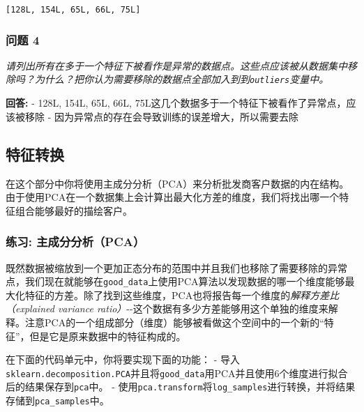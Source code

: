 \documentclass[11pt]{article}
\begin{document}
    
    \begin{Verbatim}[commandchars=\\\{\}]
[128L, 154L, 65L, 66L, 75L]

    \end{Verbatim}

    \subsubsection{问题 4}\label{ux95eeux9898-4}

\emph{请列出所有在多于一个特征下被看作是异常的数据点。这些点应该被从数据集中移除吗？为什么？把你认为需要移除的数据点全部加入到到\texttt{outliers}变量中。}

    \textbf{回答:} - 128L, 154L, 65L, 66L,
75L这几个数据多于一个特征下被看作了异常点，应该被移除 -
因为异常点的存在会导致训练的误差增大，所以需要去除

    \subsection{特征转换}\label{ux7279ux5f81ux8f6cux6362}

在这个部分中你将使用主成分分析（PCA）来分析批发商客户数据的内在结构。由于使用PCA在一个数据集上会计算出最大化方差的维度，我们将找出哪一个特征组合能够最好的描绘客户。

    \subsubsection{练习:
主成分分析（PCA）}\label{ux7ec3ux4e60-ux4e3bux6210ux5206ux5206ux6790pca}

既然数据被缩放到一个更加正态分布的范围中并且我们也移除了需要移除的异常点，我们现在就能够在\texttt{good\_data}上使用PCA算法以发现数据的哪一个维度能够最大化特征的方差。除了找到这些维度，PCA也将报告每一个维度的\emph{解释方差比（explained
variance
ratio）}-\/-这个数据有多少方差能够用这个单独的维度来解释。注意PCA的一个组成部分（维度）能够被看做这个空间中的一个新的``特征''，但是它是原来数据中的特征构成的。

在下面的代码单元中，你将要实现下面的功能： -
导入\texttt{sklearn.decomposition.PCA}并且将\texttt{good\_data}用PCA并且使用6个维度进行拟合后的结果保存到\texttt{pca}中。
-
使用\texttt{pca.transform}将\texttt{log\_samples}进行转换，并将结果存储到\texttt{pca\_samples}中。
\end{document}
